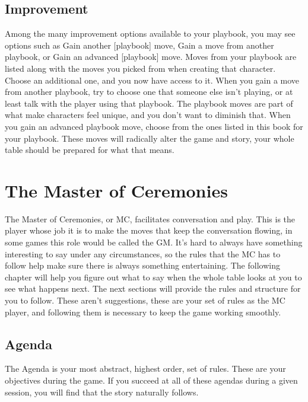 \documentclass[
  oneside,
  statementpaper,
  9pt]{memoir}
\begin{document}
\hypertarget{improvement}{%
\section{Improvement}\label{improvement}}

Among the many improvement options available to your playbook, you may
see options such as Gain another {[}playbook{]} move, Gain a move from
another playbook, or Gain an advanced {[}playbook{]} move. Moves from
your playbook are listed along with the moves you picked from when
creating that character. Choose an additional one, and you now have
access to it. When you gain a move from another playbook, try to choose
one that someone else isn't playing, or at least talk with the player
using that playbook. The playbook moves are part of what make characters
feel unique, and you don't want to diminish that. When you gain an
advanced playbook move, choose from the ones listed in this book for
your playbook. These moves will radically alter the game and story, your
whole table should be prepared for what that means.

\newpage

\hypertarget{the-master-of-ceremonies}{%
\chapter{The Master of Ceremonies}\label{the-master-of-ceremonies}}

The Master of Ceremonies, or MC, facilitates conversation and play. This
is the player whose job it is to make the moves that keep the
conversation flowing, in some games this role would be called the GM.
It's hard to always have something interesting to say under any
circumstances, so the rules that the MC has to follow help make sure
there is always something entertaining. The following chapter will help
you figure out what to say when the whole table looks at you to see what
happens next. The next sections will provide the rules and structure for
you to follow. These aren't suggestions, these are your set of rules as
the MC player, and following them is necessary to keep the game working
smoothly.

\hypertarget{agenda}{%
\section{Agenda}\label{agenda}}

The Agenda is your most abstract, highest order, set of rules. These are
your objectives during the game. If you succeed at all of these agendas
during a given session, you will find that the story naturally follows.
\end{document}
